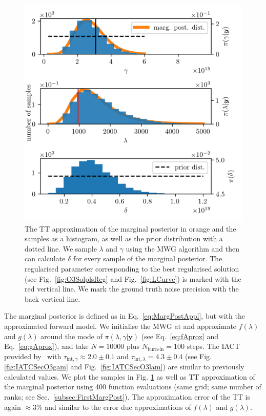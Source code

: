 \begin{figure}[ht!]
	\centering
	\includegraphics{secMargO3Res.png}
	\caption[Marginal posterior histograms and TT approximation as well as hyper-prior distribution.]{The TT approximation of the marginal posterior in orange and the samples as a histogram, as well as the prior distribution with a dotted line. We sample $\lambda$ and $\gamma$ using the MWG algorithm and then can calculate $\delta$ for every sample of the marginal posterior. The regularised parameter corresponding to the best regularised solution (see Fig.~\ref{fig:O3SolplsReg} and Fig.~\ref{fig:LCurve}) is marked with the red vertical line. We mark the ground truth noise precision with the back vertical line.}
	\label{fig:MargPostHistTT}
\end{figure}
The marginal posterior is defined as in Eq.~\ref{eq:MargPostAppl}, but with the approximated forward model.
We initialise the MWG at and approximate $f(\lambda)$ and $g(\lambda)$ around the mode of $\pi(\lambda,\gamma| \bm{y})$ (see Eq.~\ref{eq:fAprox} and Eq.~\ref{eq:gAprox}), and take $N = 10000$ plus $N_{\text{burn-in}} = 100$ steps.
The IACT provided by~\cite{drikHesse} with $\tau_{\text{int}, \gamma} \approx 2.0 \pm 0.1$ and $\tau_{\text{int}, \lambda} = 4.3 \pm 0.4 $ (see Fig. \ref{fig:IATCSecO3gam} and Fig.~\ref{fig:IATCSecO3lam}) are similar to previously calculated values.
We plot the samples in Fig. \ref{fig:MargPostHistTT} as well as TT approximation of the marginal posterior using 400 function evaluations (same grid; same number of ranks; see Sec.~\ref{subsec:FirstMargPost}).
The approximation error of the TT is again $\approx 3 \%$ and similar to the error due approximations of $f(\lambda)$ and $g(\lambda)$.

